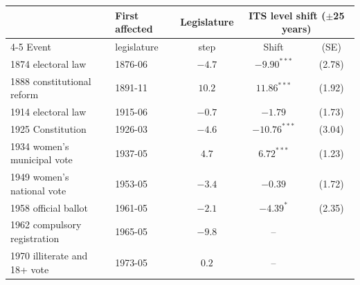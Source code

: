 \begin{tabular}{llccc}
\toprule
 & First affected & Legislature & \multicolumn{2}{c}{ITS level shift ($\pm$25 years)} \\
\cmidrule(lr){4-5}
Event & legislature & step & Shift & (SE) \\
\midrule
1874 electoral law & 1876-06 & $-4.7$ & $-9.90^{***}$ & (2.78) \\
1888 constitutional reform & 1891-11 & $10.2$ & $11.86^{***}$ & (1.92) \\
1914 electoral law & 1915-06 & $-0.7$ & $-1.79$ & (1.73) \\
1925 Constitution & 1926-03 & $-4.6$ & $-10.76^{***}$ & (3.04) \\
1934 women's municipal vote & 1937-05 & $4.7$ & $6.72^{***}$ & (1.23) \\
1949 women's national vote & 1953-05 & $-3.4$ & $-0.39$ & (1.72) \\
1958 official ballot & 1961-05 & $-2.1$ & $-4.39^{*}$ & (2.35) \\
1962 compulsory registration & 1965-05 & $-9.8$ & -- &  \\
1970 illiterate and 18+ vote & 1973-05 & $0.2$ & -- &  \\
\bottomrule
\end{tabular}
